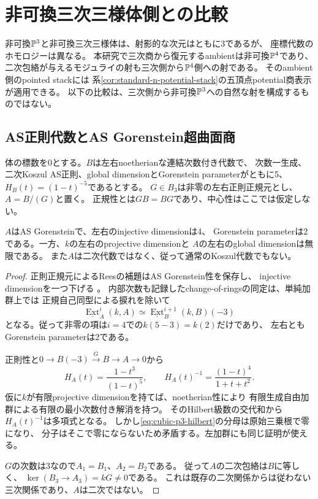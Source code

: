 \section{非可換三次三様体側との比較}
\label{sec:cubic-p3-comparison}

非可換$\mathbb P^3$と非可換三次三様体は、射影的な次元はともに3であるが、
座標代数のホモロジーは異なる。
本研究で三次商から復元するambientは非可換$\mathbb P^4$であり、
二次包絡が与えるモジュライの射も三次側から$\mathbb P^4$側への射である。
そのambient側のpointed stackには
系\ref{cor:standard-n-potential-stack}の五頂点potential商表示が適用できる。
以下の比較は、三次側から非可換$\mathbb P^3$への自然な射を構成するものではない。

\subsection{AS正則代数とAS Gorenstein超曲面商}

体の標数を0とする。$B$は左右noetherianな連結次数付き代数で、
次数一生成、二次Koszul AS正則、global dimensionとGorenstein parameterがともに5、
$H_B(t)=(1-t)^{-5}$であるとする。
$G\in B_3$は非零の左右正則正規元とし、$A=B/(G)$と置く。
正規性とは$GB=BG$であり、中心性はここでは仮定しない。

\begin{proposition}[三次商のホモロジー的型]
\label{prop:cubic-p3-gorenstein-type}
$A$はAS Gorensteinで、左右のinjective dimensionは4、
Gorenstein parameterは2である。一方、$k$の左右のprojective dimensionと
$A$の左右のglobal dimensionは無限である。
また$A$は二次代数ではなく、従って通常のKoszul代数でもない。
\end{proposition}
\begin{proof}
正則正規元によるReesの補題はAS Gorenstein性を保存し、
injective dimensionを一つ下げる
\cite[arXiv版v1, Lemma~4.4]{CSBGCCKM}。
内部次数も記録したchange-of-ringsの同定は、単純加群上では
正規自己同型による捩れを除いて
\[
 \underline{\operatorname{Ext}}^{i}_{A}(k,A)
 \simeq\underline{\operatorname{Ext}}^{i+1}_{B}(k,B)(-3)
\]
となる。従って非零の項は$i=4$での$k(5-3)=k(2)$だけであり、
左右ともGorenstein parameterは2である。

正則性と$0\to B(-3)\xrightarrow{\,G\,}B\to A\to0$から
\begin{equation}\label{eq:cubic-p3-hilbert}
 H_A(t)=\frac{1-t^3}{(1-t)^5},\qquad
 H_A(t)^{-1}=\frac{(1-t)^4}{1+t+t^2}.
\end{equation}
仮に$k$が有限projective dimensionを持てば、noetherian性により
有限生成自由加群による有限の最小次数付き解消を持つ。
そのHilbert級数の交代和から$H_A(t)^{-1}$は多項式となる。
しかし\eqref{eq:cubic-p3-hilbert}の分母は原始三乗根で零になり、
分子はそこで零にならないため矛盾する。左加群にも同じ証明が使える。

$G$の次数は3なので$A_1=B_1$、$A_2=B_2$である。
従って$A$の二次包絡は$B$に等しく、
$\ker(B_3\to A_3)=kG\ne0$である。
これは既存の二次関係からは従わない三次関係であり、$A$は二次ではない。
\end{proof}

